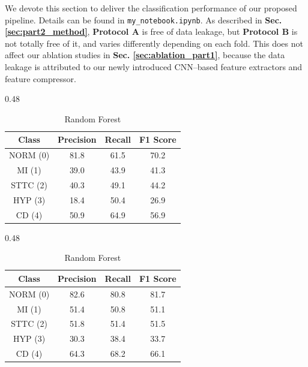 \label{sec:results_part2}
We devote this section to deliver the classification performance of our proposed pipeline. Details can be found in \texttt{my\_notebook.ipynb}.
As described in \textbf{Sec. \ref{sec:part2_method}}, \textbf{Protocol A} is free of data leakage, but \textbf{Protocol B} is not totally free of it, and varies differently depending on each fold.
This does not affect our ablation studies in \textbf{Sec. \ref{sec:ablation_part1}}, because the data leakage is attributed to our newly introduced CNN–based feature extractors and feature compressor.

\begin{table}[H]
    \centering
    \caption{\textbf{Protocol B} class–wise performance metrics across models.}
    \label{tab:cv_classwise_part2}

    \begin{subtable}[t]{0.48\textwidth}
        \centering
        \caption{KNN}
        \label{tab:cv_knn_part2}
        \begin{tabular}{cccc}
            \toprule
            Class & Precision & Recall & F1 Score \\
            \midrule
            NORM (0) & 81.8 & 61.5 & 70.2 \\
            MI   (1) & 39.0 & 43.9 & 41.3 \\
            STTC (2) & 40.3 & 49.1 & 44.2 \\
            HYP  (3) & 18.4 & 50.4 & 26.9 \\
            CD   (4) & 50.9 & 64.9 & 56.9 \\
            \bottomrule
        \end{tabular}
    \end{subtable}
    \hfill
    \begin{subtable}[t]{0.48\textwidth}
        \centering
        \caption{Random Forest}
        \label{tab:cv_rf_part2}
        \begin{tabular}{cccc}
            \toprule
            Class & Precision & Recall & F1 Score \\
            \midrule
            NORM (0) & 82.6 & 80.8 & 81.7 \\
            MI   (1) & 51.4 & 50.8 & 51.1 \\
            STTC (2) & 51.8 & 51.4 & 51.5 \\
            HYP  (3) & 30.3 & 38.4 & 33.7 \\
            CD   (4) & 64.3 & 68.2 & 66.1 \\
            \bottomrule
        \end{tabular}
    \end{subtable}


\end{table}
